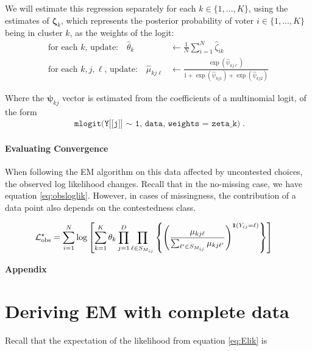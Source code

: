 \documentclass[11pt]{article}
\begin{document}
We will estimate this regression separately for each \(k \in \{1, ..., K\}\), using the estimates of \(\bm{\zeta}_{k}\), which represents the posterior probability of voter \(i \in \{1, ..., K\}\) being in cluster \(k\), as the weights of the logit:
\begin{align}
\text{for each \(k\), update: }~~~  \widehat{\theta}_{k} &\leftarrow \frac{1}{N}\sum^N_{i = 1}\widehat{\zeta}_{ik} \\
\text{for each \(k, j, \ell\), update: }~~~ \widehat{\mu}_{kj\ell} &\leftarrow  \frac{\exp\left(\widehat\psi_{kj\ell}\right)}{1 + \exp\left(\widehat\psi_{kj1}\right) + \exp\left(\widehat\psi_{kj2}\right)}
\end{align}

Where the \(\bm\psi_{kj}\) vector is estimated from the coefficients of a multinomial logit, of the form 
\begin{align*}
\texttt{mlogit(Y[[j]] \(\sim\) 1, data, weights = zeta\_k)}.
\end{align*}

\paragraph{Evaluating Convergence} When following the EM algorithm on this data affected by uncontested choices, the observed log likelihood changes. Recall that in the no-missing case,  we have equation \ref{eq:obsloglik}. However, in cases of missingness, the contribution of a data point also depends on the contestedness class.

\begin{align*}
{\mathcal{L}}^{\star}_{\text{obs}} &= \sum^{N}_{i=1}\log \left[\sum^{K}_{k=1}\theta_k \prod^{D}_{j=1}\prod_{\ell \in S_{M_{ij}}}\left\{\left(\frac{\mu_{kj\ell}}{\sum_{\ell^\prime \in S_{M_{ij}}} \mu_{kj\ell^\prime}}\right)^{\bm{1}\left(Y_{ij} = \ell\right)}\right\}\right]
\end{align*}


\newpage
\appendix

\begin{centering}
\textbf{\large{Appendix}}
\end{centering}

\section{Deriving EM with complete data}

Recall that the expectation of the likelihood from equation \ref{eq:Elik} is
\end{document}
